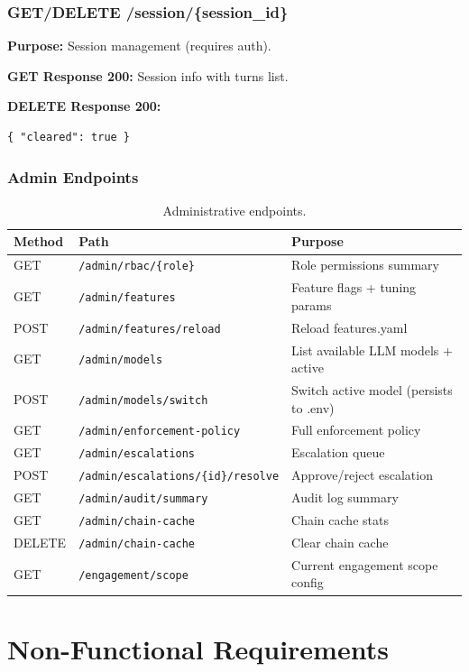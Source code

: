\documentclass[10pt,journal,onecolumn]{IEEEtran}
\begin{document}
\subsubsection{GET/DELETE /session/\{session\_id\}}
\textbf{Purpose:} Session management (requires auth).

\textbf{GET Response 200:} Session info with turns list.

\textbf{DELETE Response 200:}
\begin{lstlisting}
{ "cleared": true }
\end{lstlisting}

\subsubsection{Admin Endpoints}
\begin{table}[t]
\caption{Administrative endpoints.}
\label{tab:admin}
\begin{tabularx}{\textwidth}{l >{\ttfamily}l X}
\toprule
\textbf{Method} & \textbf{Path} & \textbf{Purpose}\\
\midrule
GET & \texttt{/admin/rbac/\{role\}} & Role permissions summary\\
GET & \texttt{/admin/features} & Feature flags + tuning params\\
POST & \texttt{/admin/features/reload} & Reload features.yaml\\
GET & \texttt{/admin/models} & List available LLM models + active\\
POST & \texttt{/admin/models/switch} & Switch active model (persists to .env)\\
GET & \texttt{/admin/enforcement-policy} & Full enforcement policy\\
GET & \texttt{/admin/escalations} & Escalation queue\\
POST & \texttt{/admin/escalations/\{id\}/resolve} & Approve/reject escalation\\
GET & \texttt{/admin/audit/summary} & Audit log summary\\
GET & \texttt{/admin/chain-cache} & Chain cache stats\\
DELETE & \texttt{/admin/chain-cache} & Clear chain cache\\
GET & \texttt{/engagement/scope} & Current engagement scope config\\
\bottomrule
\end{tabularx}
\end{table}
\section{Non-Functional Requirements}
\end{document}
